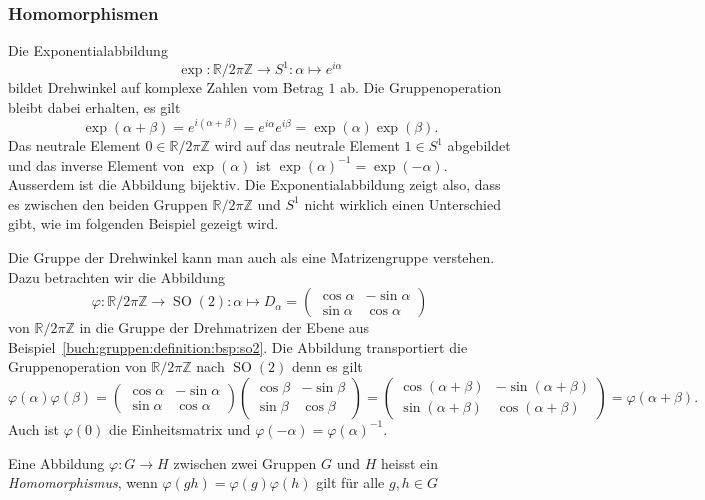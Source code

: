 %
%
\subsubsection{Homomorphismen}
Die Exponentialabbildung
\[
\exp
\colon
\mathbb{R}/2\pi\mathbb{Z} \to S^1
:
\alpha \mapsto e^{i\alpha}
\]
bildet Drehwinkel auf komplexe Zahlen vom Betrag $1$ ab.
Die Gruppenoperation bleibt dabei erhalten, es gilt
\[
\exp(\alpha + \beta)
=
e^{i(\alpha+\beta)}
=
e^{i\alpha}
e^{i\beta}
=
\exp(\alpha)
\exp(\beta).
\]
Das neutrale Element $0\in\mathbb{R}/2\pi\mathbb{Z}$ wird auf
das neutrale Element $1\in S^1$ abgebildet und das inverse
Element von $\exp(\alpha)$ ist
$ \exp(\alpha)^{-1} = \exp(-\alpha) $.
Ausserdem ist die Abbildung bijektiv.
Die Exponentialabbildung zeigt also, dass es zwischen den beiden
Gruppen $\mathbb{R}/2\pi\mathbb{Z}$ und $S^1$ nicht wirklich einen
Unterschied gibt, wie im folgenden Beispiel gezeigt wird.

Die Gruppe der Drehwinkel kann man auch als eine Matrizengruppe
verstehen.
Dazu betrachten wir die Abbildung
\[
\varphi
\colon
\mathbb{R}/2\pi\mathbb{Z}
\to
\operatorname{SO}(2)
:
\alpha
\mapsto
D_\alpha
=
\begin{pmatrix}
\cos\alpha & -\sin\alpha \\
\sin\alpha &  \cos\alpha
\end{pmatrix}
\]
von $\mathbb{R}/2\pi\mathbb{Z}$ in die Gruppe der Drehmatrizen der
Ebene aus Beispiel~\ref{buch:gruppen:definition:bsp:so2}.
Die Abbildung transportiert die Gruppenoperation von
$\mathbb{R}/2\pi\mathbb{Z}$ nach $\operatorname{SO}(2)$ denn es gilt
\[
\varphi(\alpha)\varphi(\beta)
=
\begin{pmatrix}
\cos\alpha & -\sin\alpha \\
\sin\alpha &  \cos\alpha
\end{pmatrix}
\begin{pmatrix}
\cos\beta & -\sin\beta \\
\sin\beta &  \cos\beta
\end{pmatrix}
=
\begin{pmatrix}
\cos(\alpha+\beta) & -\sin(\alpha+\beta) \\
\sin(\alpha+\beta) &  \cos(\alpha+\beta)
\end{pmatrix}
=
\varphi(\alpha+\beta).
\]
Auch ist $\varphi(0)$ die Einheitsmatrix und
$\varphi(-\alpha)=\varphi(\alpha)^{-1}$.

\begin{definition}
\label{buch:gruppen:definition:def:homomorphismus}
Eine Abbildung $\varphi\colon G\to H$ zwischen zwei Gruppen $G$ und $H$
heisst ein {\em Homomorphismus}, wenn
$\varphi(gh)=\varphi(g)\varphi(h)$ gilt für alle $g,h\in G$
\end{definition}

